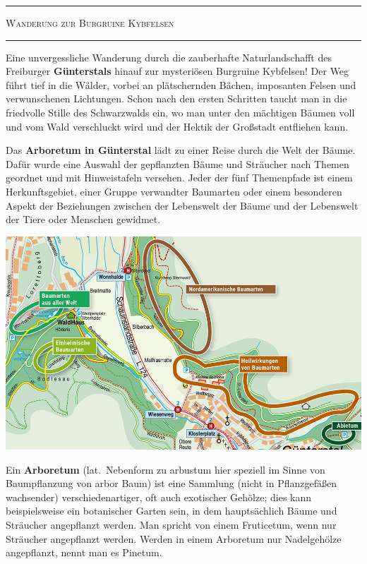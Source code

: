 \documentclass[landscape, a4paper]{article}
\newcommand\alert[1]{\textcolor{PrimaryColor}{\textbf{#1}}}
\begin{document}
\noindent
\centering
\footnotesize
\begin{minipage}[t]{0.31\textwidth}
	\setlength{\parskip}{0.25cm}

	\vspace{0.5cm}

		\textcolor{PrimaryColor}{
			\rule{\linewidth}{0.5mm}
			\vspace{-0.1cm}
			\begin{center}
				\large
				\textsc{Wanderung zur Burgruine Kybfelsen}
			\end{center}
			\rule{\linewidth}{0.5mm}
		}

		Eine unvergessliche Wanderung durch die zauberhafte Naturlandschafft des Freiburger \alert{Günterstals} hinauf zur mysteriösen Burgruine Kybfelsen! Der Weg führt tief in die Wälder, vorbei an plätschernden Bächen, imposanten Felsen und verwunschenen Lichtungen. Schon nach den ersten Schritten taucht man in die friedvolle Stille des Schwarzwalds ein, wo man unter den mächtigen Bäumen voll und vom Wald verschluckt wird und der Hektik der Großstadt entfliehen kann.

		Das \alert{Arboretum in Günterstal} lädt zu einer Reise durch die Welt der Bäume. Dafür wurde eine Auswahl der gepflanzten Bäume und Sträucher nach Themen geordnet und mit Hinweistafeln versehen. Jeder der fünf Themenpfade ist einem Herkunftsgebiet, einer Gruppe verwandter Baumarten oder einem besonderen Aspekt der Beziehungen zwischen der Lebenswelt der Bäume und der Lebenswelt der Tiere oder Menschen gewidmet.

		\includegraphics[width=\linewidth]{./figures/arboretum.png}
		\setlength{\parskip}{0.25cm}

		Ein \alert{Arboretum} (lat.\ Nebenform zu arbustum hier speziell im Sinne von Baumpflanzung von arbor Baum) ist eine Sammlung (nicht in Pflanzgefäßen wachsender) verschiedenartiger, oft auch exotischer Gehölze; dies kann beispielsweise ein botanischer Garten sein, in dem hauptsächlich Bäume und Sträucher angepflanzt werden. Man spricht von einem Fruticetum, wenn nur Sträucher angepflanzt werden. Werden in einem Arboretum nur Nadelgehölze angepflanzt, nennt man es Pinetum.
\end{minipage}%
\end{document}
